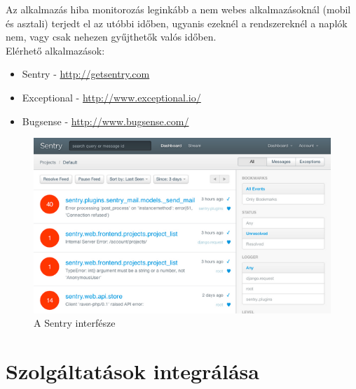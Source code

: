 Az alkalmazás hiba monitorozás leginkább a nem webes alkalmazásoknál (mobil és asztali) terjedt el az utóbbi időben, ugyanis ezeknél a rendszereknél a naplók nem, vagy csak nehezen gyűjthetők valós időben.\\

Elérhető alkalmazások:
\begin{itemize}
\item Sentry - \url{http://getsentry.com}
\item Exceptional - \url{http://www.exceptional.io/}
\item Bugsense - \url{http://www.bugsense.com/}
\end{itemize}

\begin{figure}[ht]
	\centering
		\includegraphics[scale=1]{assets/sentry.png}%
		\caption[DUMMY]%
		{A Sentry interfésze}%
		\label{fig:sentry}
\end{figure}

\section{Szolgáltatások integrálása\\}

